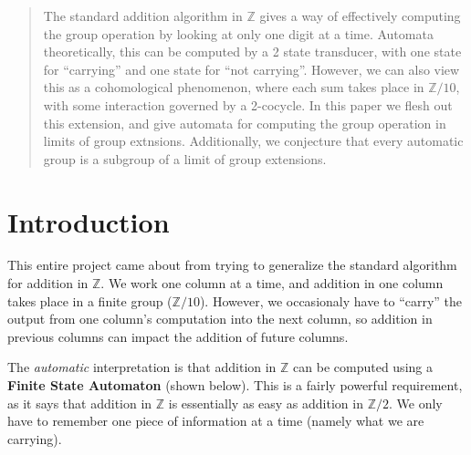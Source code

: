 \documentclass[12pt]{article}
\theoremstyle{definition}
\newcommand{\Z}{\mathbb{Z}}
\begin{document}
\begin{abstract}
  The standard addition algorithm in $\Z$ gives a way of effectively
  computing the group operation by looking at only one digit at a time.
  Automata theoretically, this can be computed by a 2 state transducer,
  with one state for ``carrying'' and one state for ``not carrying''. 
  However, we can also view this as a cohomological phenomenon, where
  each sum takes place in $\Z/10$, with some interaction governed by
  a 2-cocycle. In this paper we flesh out this extension, and give
  automata for computing the group operation in limits of group extnsions.
  Additionally, we conjecture that every automatic group is a subgroup
  of a limit of group extensions.
\end{abstract}

\section{Introduction}

  This entire project came about from trying to generalize the standard
  algorithm for addition in $\Z$. We work one column at a time, and 
  addition in one column takes place in a finite group ($\Z / 10$).
  However, we occasionaly have to ``carry'' the output from one column's
  computation into the next column, so addition in previous columns can
  impact the addition of future columns.

  The \emph{automatic} interpretation is that addition in $\Z$ can be 
  computed using a \textbf{Finite State Automaton} (shown below). This is
  a fairly powerful requirement, as it says that addition in $\Z$ is 
  essentially as easy as addition in $\Z / 2$. We only have to remember
  one piece of information at a time (namely what we are carrying). 
\end{document}
